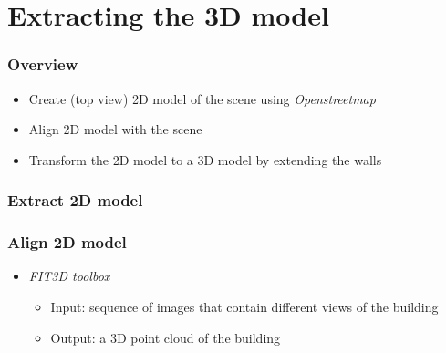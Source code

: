 \documentclass{beamer}
\begin{document}




\section{Extracting the 3D model}
\frame
{
	\frametitle{Overview}
	\begin{itemize}
	\item <+-| alert@+> Create (top view) 2D model of the scene using \emph{Openstreetmap}
	\item <+-| alert@+> Align 2D model with the scene 
	\item <+-| alert@+> Transform the 2D model to a 3D model by extending the walls
	\end{itemize}
}

\frame
{
	\frametitle{Extract 2D model}
}

\frame
{
	\frametitle{Align 2D model}
	\begin{itemize}
	\item <+-| alert@+> \emph{FIT3D toolbox}
		\begin{itemize}
		\item <+-| alert@+> Input: sequence of images that contain different views of the building
		\item <+-| alert@+> Output: a 3D point cloud of the building
		\end{itemize}
	\end{itemize}
}

\frame
{
}
\end{document}
